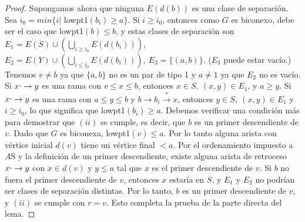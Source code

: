 \begin{proof}
Supongamos ahora que ninguna $E\left(d\left(b\right)\right)$ es una clase de separación. Sea $i_{0} = min\{i | $ lowpt1$\left(b_{i}\right) \geq a\}$. Si $i \geq i_{0}$, entonces como $G$ es biconexo, debe ser el caso que lowpt1$\left(b\right) \le b$, y estas clases de separación son $E_{1} = E\left(S\right) \cup \left(\bigcup_{i \geq i_{0}}E\left(d\left(b_{i}\right)\right)\right)$,\\ $E_{2} = E\left(Y\right) \cup \left(\bigcup_{i \le i_{0}} E\left(d\left(b_{i}\right)\right)\right),~ E_{3} = \{(a, b)\}$. ($E_{3}$ puede estar vacío.) Tenemos $v \neq b$ ya que $\{a, b\}$ no es un par de tipo 1 y $a \neq 1$ ya que $E_{2}$ no es vacío. Si $x \rule[1mm]{.1cm}{0.4pt} \rightarrow y$ es una rama con $v \leq x \le b$, entonces $x \in S,~ \left(x, y\right) \in E_{1}$, y $a \geq y$. Si $x \rule[1mm]{.1cm}{0.4pt} \rightarrow y$ es una rama con $a \le y \le b$ y $b \rightarrow b_{i} \overset{\ast}{\rightarrow} x$, entonces $y \in S,~ \left(x,y\right) \in E_{1}$ y $ i \geq i_{0}$, lo que significa que lowpt1$\left(b_{i}\right) \geq a$. Debemos verificar una condición más para demostrar que $\left(ii\right)$ se cumple, es decir, que $b$ es un primer descendiente de $v$. Dado que $G$ es biconexa, lowpt1$\left(v\right) \le a$. Por lo tanto alguna arista con vértice inicial $d\left(v\right)$ tiene un vértice final $ < a$. Por el ordenamiento impuesto a $A$S y la definición de un primer descendiente, existe alguna arista de retroceso $x \rule[1mm]{.1cm}{0.4pt} \rightarrow y$ con $x \in d\left(v\right)$ y $y \le a$ tal que $x$ es el primer descendiente de $v$. Si $b$ no fuera el primer descendiente de $v$, entonces $x$ estaría en $S$, y $E_{1}$ y $E_{2}$ no podrían ser clases de separación distintas. Por lo tanto, $b$ es un primer descendiente de $v$, y $\left(ii\right)$ se cumple con $r = v$. Esto completa la prueba de la parte directa del lema.
\end{proof}

